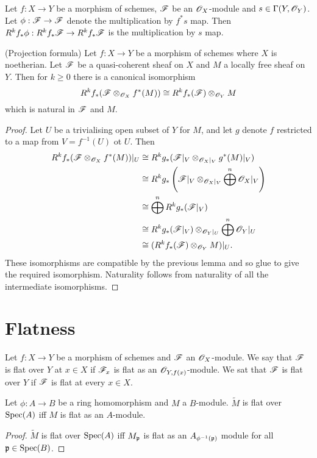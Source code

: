 \documentclass{memoir}
\begin{document}
\begin{lemma}
    Let $f:X\to Y$ be a morphism of schemes, $\mathscr{F}$ be an $\mathscr{O}_X$-module and $s\in \Gamma(Y,\mathscr{O}_Y)$.
    Let $\phi:\mathscr{F}\to \mathscr{F}$ denote the multiplication by $f^*s$ map.
    Then $R^kf_*\phi:R^kf_*\mathscr{F}\to R^kf_*\mathscr{F}$ is the multiplication by $s$ map.
\end{lemma}
\begin{proposition}
    (Projection formula) Let $f:X\to Y$ be a morphism of schemes where $X$ is noetherian.
    Let $\mathscr{F}$ be a quasi-coherent sheaf on $X$ and $M$ a locally free sheaf on $Y$. 
    Then for $k\ge 0$ there is a canonical isomorphism 
    \begin{equation}
        R^kf_*(\mathscr{F}\otimes_{\mathscr{O}_X} f^*(M)) \cong R^kf_*(\mathscr{F})\otimes_{\mathscr{O}_Y} M
    \end{equation}
    which is natural in $\mathscr{F}$ and $M$.
\end{proposition}
\begin{proof}
    Let $U$ be a trivialising open subset of $Y$ for $M$, and let $g$ denote $f$ restricted to a map from $V=f^{-1}(U)$ ot $U$.
    Then 
    \begin{align}
        R^kf_*(\mathscr{F}\otimes_{\mathscr{O}_X} f^*(M))|_U &\cong R^kg_*(\mathscr{F}|_V\otimes_{\mathscr{O}_X|_V}g^*(M)|_V) \nonumber \\
        &\cong R^kg_*\left(\mathscr{F}|_V\otimes_{\mathscr{O}_X|_V}\bigoplus^n\mathscr{O}_X|_V\right) \nonumber \\
        &\cong \bigoplus^nR^kg_*(\mathscr{F}|_V) \nonumber \\
        &\cong R^kg_*(\mathscr{F}|_V)\otimes_{\mathscr{O}_Y|_U}\bigoplus^n\mathscr{O}_Y|_U\nonumber \\
        &\cong (R^kf_*(\mathscr{F})\otimes_{\mathscr{O}_Y}M)|_U.
    \end{align}
    These isomorphisms are compatible by the previous lemma and so glue to give the required isomorphism.
    Naturality follows from naturality of all the intermediate isomorphisms.
\end{proof}
\section{Flatness}
\begin{definition}
    Let $f:X\to Y$ be a morphism of schemes and $\mathscr{F}$ an $\mathscr{O}_X$-module.
    We say that $\mathscr{F}$ is flat over $Y$ at $x\in X$ if $\mathscr{F}_x$ is flat as an $\mathscr{O}_{Y,f(x)}$-module.
    We sat that $\mathscr{F}$ is flat over $Y$ if $\mathscr{F}$ is flat at every $x\in X$.
\end{definition}
\begin{proposition}
    Let $\phi:A\to B$ be a ring homomorphism and $M$ a $B$-module.
    $\tilde M$ is flat over $\operatorname{Spec}(A)$ iff $M$ is flat as an $A$-module.
\end{proposition}
\begin{proof}
    $\tilde M$ is flat over $\operatorname{Spec}(A)$ iff $M_{\mathfrak{p}}$ is flat as an $A_{\phi^{-1}(\mathfrak{p})}$ module for all $\mathfrak{p}\in \operatorname{Spec}(B)$.
\end{proof}
\end{document}
